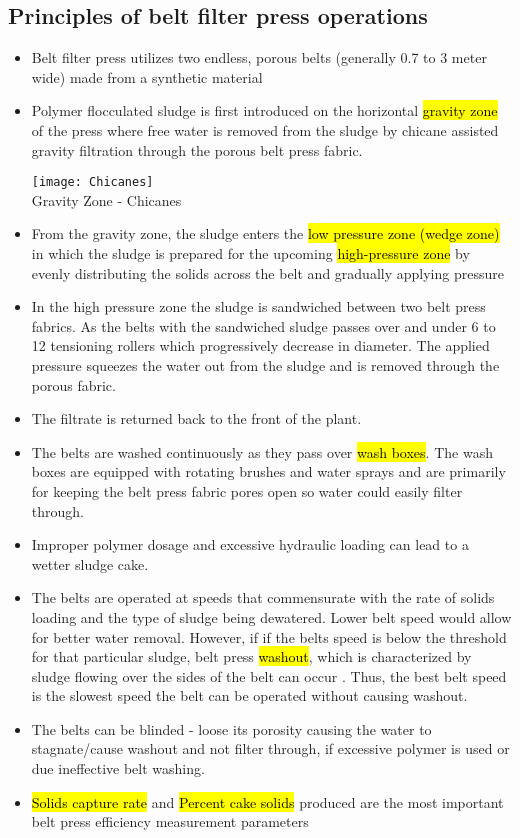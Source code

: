 \subsection{Principles of belt filter press operations}
					\begin{itemize}
						\item Belt filter press utilizes two endless, porous belts (generally 0.7 to 3 meter wide) made from a synthetic material
						\item Polymer flocculated sludge is first introduced on the horizontal \hl{gravity zone} of the press where free water is removed from the sludge by chicane assisted gravity filtration through the porous belt press fabric.
						\begin{center}
						\texttt{[image: Chicanes]}\\
						Gravity Zone - Chicanes
						\end{center}
						\item From the gravity zone, the sludge enters the \hl{low pressure zone (wedge zone)} in which the sludge is prepared for the upcoming \hl{high-pressure zone} by evenly distributing the solids across the belt and gradually applying pressure
						\item In the high pressure zone the sludge is sandwiched between two belt press fabrics. As the belts with the sandwiched sludge passes over and under 6 to 12 tensioning rollers which progressively decrease in diameter.  The applied pressure squeezes the water out from the sludge and is removed through the porous fabric.
						\item The filtrate is returned back to the front of the plant.
						\item The belts are washed continuously as they pass over \hl{wash boxes}.  The wash boxes are equipped with rotating brushes and water sprays and are primarily for keeping the belt press fabric pores open so water could easily filter through.  
						\item Improper polymer dosage and excessive hydraulic loading can lead to a wetter sludge cake.
						\item The belts are operated at speeds that commensurate with the rate of solids loading and the type of sludge being dewatered. Lower belt speed would allow for better water removal.  However, if if the belts speed is below the threshold for that particular sludge, belt press \hl{washout}, which is characterized by sludge flowing over the sides of the belt can occur .  Thus, the best belt speed is the slowest speed the belt can be operated without causing washout.
						\item The belts can be blinded - loose its porosity causing the water to stagnate/cause washout and not filter through, if excessive polymer is used or due ineffective belt washing.
						\item \hl{Solids capture rate} and \hl{Percent cake solids} produced are the most important belt press efficiency measurement parameters
					\end{itemize}
